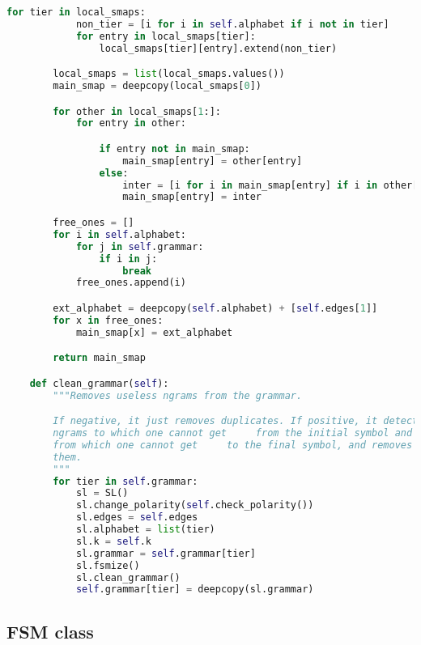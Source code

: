 \begin{lstlisting}[language=Python]
        for tier in local_smaps:
            non_tier = [i for i in self.alphabet if i not in tier]
            for entry in local_smaps[tier]:
                local_smaps[tier][entry].extend(non_tier)

        local_smaps = list(local_smaps.values())
        main_smap = deepcopy(local_smaps[0])

        for other in local_smaps[1:]:
            for entry in other:

                if entry not in main_smap:
                    main_smap[entry] = other[entry]
                else:
                    inter = [i for i in main_smap[entry] if i in other[entry]]
                    main_smap[entry] = inter

        free_ones = []
        for i in self.alphabet:
            for j in self.grammar:
                if i in j:
                    break
            free_ones.append(i)

        ext_alphabet = deepcopy(self.alphabet) + [self.edges[1]]
        for x in free_ones:
            main_smap[x] = ext_alphabet

        return main_smap

    def clean_grammar(self):
        """Removes useless ngrams from the grammar.

        If negative, it just removes duplicates. If positive, it detects
        ngrams to which one cannot get     from the initial symbol and
        from which one cannot get     to the final symbol, and removes
        them.
        """
        for tier in self.grammar:
            sl = SL()
            sl.change_polarity(self.check_polarity())
            sl.edges = self.edges
            sl.alphabet = list(tier)
            sl.k = self.k
            sl.grammar = self.grammar[tier]
            sl.fsmize()
            sl.clean_grammar()
            self.grammar[tier] = deepcopy(sl.grammar)
\end{lstlisting}

\subsection*{FSM class}


